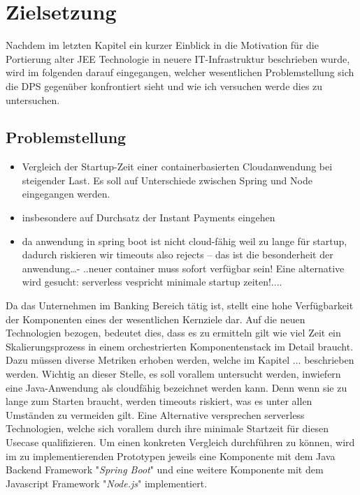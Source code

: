 \chapter{Zielsetzung}

Nachdem im letzten Kapitel ein kurzer Einblick in die Motivation für die Portierung alter JEE Technologie in neuere IT-Infrastruktur beschrieben wurde, wird im folgenden darauf eingegangen, welcher wesentlichen Problemstellung sich die DPS gegenüber konfrontiert sieht und wie ich versuchen werde dies zu untersuchen.

\section{Problemstellung}
\begin{itemize}
  \item Vergleich der Startup-Zeit einer containerbasierten Cloudanwendung bei steigender Last. Es soll auf Unterschiede zwischen Spring und Node eingegangen werden.
  \item insbesondere auf Durchsatz der Instant Payments eingehen
  \item da anwendung in spring boot ist nicht cloud-fähig weil zu lange für startup, dadurch riskieren wir timeouts also rejects – das ist die besonderheit der anwendung…- ..neuer container muss sofort verfügbar sein! Eine alternative wird gesucht: serverless vespricht minimale startup zeiten!....
\end{itemize}

Da das Unternehmen im Banking Bereich tätig ist, stellt eine hohe Verfügbarkeit der Komponenten eines der wesentlichen Kernziele dar. Auf die neuen Technologien bezogen, bedeutet dies, dass es zu ermitteln gilt wie viel Zeit ein Skalierungsprozess in einem orchestrierten Komponentenstack im Detail braucht. Dazu müssen diverse Metriken erhoben werden, welche im Kapitel ...  beschrieben werden. Wichtig an dieser Stelle, es soll vorallem untersucht werden, inwiefern eine Java-Anwendung als cloudfähig bezeichnet werden kann. Denn wenn sie zu lange zum Starten braucht, werden timeouts riskiert, was es unter allen Umständen zu vermeiden gilt. Eine Alternative versprechen serverless Technologien, welche sich vorallem durch ihre minimale Startzeit für diesen Usecase qualifizieren. Um einen konkreten Vergleich durchführen zu können, wird im zu implementierenden Prototypen jeweils eine Komponente mit dem Java Backend Framework "\emph{Spring Boot}" und eine weitere Komponente mit dem Javascript Framework "\emph{Node.js}" implementiert. 


